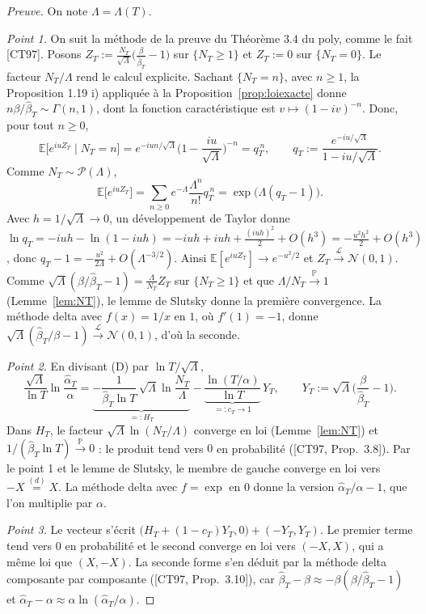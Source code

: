 \begin{proof}[Preuve]
On note $\Lambda=\Lambda(T)$.

\emph{Point 1.} On suit la méthode de la preuve du Théorème 3.4 du poly, comme le fait [CT97]. Posons $Z_T:=\frac{N_T}{\sqrt{\Lambda}}\big(\frac{\beta}{\hat\beta_T}-1\big)$ sur $\{N_T\ge1\}$ et $Z_T:=0$ sur $\{N_T=0\}$. Le facteur $N_T/\Lambda$ rend le calcul explicite. Sachant $\{N_T=n\}$, avec $n\ge1$, la Proposition 1.19 i) appliquée à la Proposition~\ref{prop:loiexacte} donne $n\beta/\hat\beta_T\sim\Gamma(n,1)$, dont la fonction caractéristique est $v\mapsto(1-iv)^{-n}$. Donc, pour tout $n\ge0$,
\[
\mathbb{E}\big[e^{iuZ_T}\mid N_T=n\big]=e^{-iun/\sqrt\Lambda}\Big(1-\frac{iu}{\sqrt\Lambda}\Big)^{-n}=q_T^{\,n},
\qquad q_T:=\frac{e^{-iu/\sqrt\Lambda}}{1-iu/\sqrt\Lambda}.
\]
Comme $N_T\sim\mathcal{P}(\Lambda)$,
\[
\mathbb{E}\big[e^{iuZ_T}\big]=\sum_{n\ge0}e^{-\Lambda}\frac{\Lambda^n}{n!}q_T^{\,n}=\exp\big(\Lambda(q_T-1)\big).
\]
Avec $h=1/\sqrt\Lambda\to0$, un développement de Taylor donne $\ln q_T=-iuh-\ln(1-iuh)=-iuh+iuh+\frac{(iuh)^2}{2}+O(h^3)=-\frac{u^2h^2}{2}+O(h^3)$, donc $q_T-1=-\frac{u^2}{2\Lambda}+O(\Lambda^{-3/2})$. Ainsi $\mathbb{E}[e^{iuZ_T}]\to e^{-u^2/2}$ et $Z_T\xrightarrow{\mathcal{L}}\mathcal{N}(0,1)$. Comme $\sqrt\Lambda(\beta/\hat\beta_T-1)=\frac{\Lambda}{N_T}Z_T$ sur $\{N_T\ge1\}$ et que $\Lambda/N_T\xrightarrow{\mathbb{P}}1$ (Lemme~\ref{lem:NT}), le lemme de Slutsky donne la première convergence. La méthode delta avec $f(x)=1/x$ en $1$, où $f'(1)=-1$, donne $\sqrt\Lambda(\hat\beta_T/\beta-1)\xrightarrow{\mathcal{L}}\mathcal{N}(0,1)$, d'où la seconde.

\emph{Point 2.} En divisant (D) par $\ln T/\sqrt\Lambda$,
\[
\frac{\sqrt\Lambda}{\ln T}\ln\frac{\hat\alpha_T}{\alpha}
=\underbrace{-\frac{1}{\hat\beta_T\ln T}\,\sqrt\Lambda\ln\frac{N_T}{\Lambda}}_{=:H_T}
-\underbrace{\frac{\ln(T/\alpha)}{\ln T}}_{=:c_T\to1}\,Y_T,
\qquad Y_T:=\sqrt\Lambda\Big(\frac{\beta}{\hat\beta_T}-1\Big).
\]
Dans $H_T$, le facteur $\sqrt\Lambda\ln(N_T/\Lambda)$ converge en loi (Lemme~\ref{lem:NT}) et $1/(\hat\beta_T\ln T)\xrightarrow{\mathbb{P}}0$ : le produit tend vers $0$ en probabilité ([CT97, Prop.~3.8]). Par le point 1 et le lemme de Slutsky, le membre de gauche converge en loi vers $-X\overset{(d)}{=}X$. La méthode delta avec $f=\exp$ en $0$ donne la version $\hat\alpha_T/\alpha-1$, que l'on multiplie par $\alpha$.

\emph{Point 3.} Le vecteur s'écrit $\big(H_T+(1-c_T)Y_T,0\big)+(-Y_T,Y_T)$. Le premier terme tend vers $0$ en probabilité et le second converge en loi vers $(-X,X)$, qui a même loi que $(X,-X)$. La seconde forme s'en déduit par la méthode delta composante par composante ([CT97, Prop.~3.10]), car $\hat\beta_T-\beta\approx-\beta(\beta/\hat\beta_T-1)$ et $\hat\alpha_T-\alpha\approx\alpha\ln(\hat\alpha_T/\alpha)$.
\end{proof}

